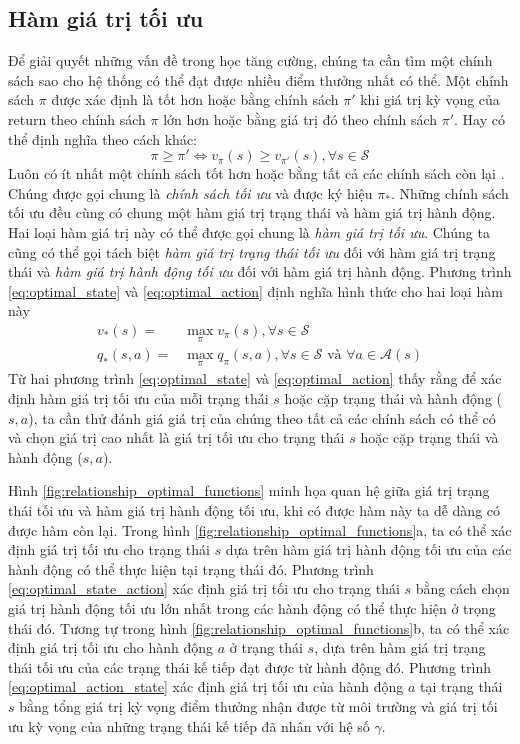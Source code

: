 	\subsection{Hàm giá trị tối ưu}
	Để giải quyết những vấn đề trong học tăng cường, chúng ta cần tìm một chính sách sao cho hệ thống có thể đạt được nhiều điểm thưởng nhất có thể. Một chính sách $\pi$ được xác định là tốt hơn hoặc bằng chính sách $\pi'$ khi giá trị kỳ vọng của return theo chính sách $\pi$ lớn hơn hoặc bằng giá trị đó theo chính sách $\pi'$. Hay có thể định nghĩa theo cách khác:
	\begin{equation}
		\pi \geq \pi' \Longleftrightarrow v_{\pi}(s) \geq v_{\pi'}(s), \forall s \in \mathcal{S}
	\end{equation}
	Luôn có ít nhất một chính sách tốt hơn hoặc bằng tất cả các chính sách còn lại \cite{sutton1998introduction}. Chúng được gọi chung là \textit{chính sách tối ưu} và được ký hiệu $\pi_{*}$. Những chính sách tối ưu đều cùng có chung một hàm giá trị trạng thái và hàm giá trị hành động. Hai loại hàm giá trị này có thể được gọi chung là \textit{hàm giá trị tối ưu}. Chúng ta cũng có thể gọi tách biệt \textit{hàm giá trị trạng thái tối ưu} đối với hàm giá trị trạng thái và \textit{hàm giá trị hành động tối ưu} đối với hàm giá trị hành động. Phương trình \ref{eq:optimal_state} và \ref{eq:optimal_action} định nghĩa hình thức cho hai loại hàm này
	\begin{align}
		v_{*}(s) = {} & \max_{\pi}v_{\pi}(s), \forall s \in \mathcal{S} \label{eq:optimal_state} \\
		q_{*}(s,a) = {} & \max_{\pi}q_{\pi}(s,a), \forall s \in \mathcal{S} \text{ và } \forall a \in \mathcal{A}(s) \label{eq:optimal_action}
	\end{align}
	Từ hai phương trình \ref{eq:optimal_state} và \ref{eq:optimal_action} thấy rằng để xác định hàm giá trị tối ưu của mỗi trạng thái $s$ hoặc cặp trạng thái và hành động ($s,a$), ta cần thử đánh giá giá trị của chúng theo tất cả các chính sách có thể có và chọn giá trị cao nhất là giá trị tối ưu cho trạng thái $s$ hoặc cặp trạng thái và hành động ($s,a$).
	
	Hình \ref{fig:relationship_optimal_functions} minh họa quan hệ giữa giá trị trạng thái tối ưu và hàm giá trị hành động tối ưu, khi có được hàm này ta dễ dàng có được hàm còn lại. Trong hình \ref{fig:relationship_optimal_functions}a, ta có thể xác định giá trị tối ưu cho trạng thái $s$ dựa trên hàm giá trị hành động tối ưu của các hành động có thể thực hiện tại trạng thái đó. Phương trình \ref{eq:optimal_state_action} xác định giá trị tối ưu cho trạng thái $s$ bằng cách chọn giá trị hành động tối ưu lớn nhất trong các hành động có thể thực hiện ở trọng thái đó. Tương tự trong hình \ref{fig:relationship_optimal_functions}b, ta có thể xác định giá trị tối ưu cho hành động $a$ ở trạng thái $s$, dựa trên hàm giá trị trạng thái tối ưu của các trạng thái kế tiếp đạt được từ hành động đó. Phương trình \ref{eq:optimal_action_state} xác định giá trị tối ưu của hành động $a$ tại trạng thái $s$ bằng tổng giá trị kỳ vọng điểm thưởng nhận được từ môi trường và giá trị tối ưu kỳ vọng của những trạng thái kế tiếp đã nhân với hệ số $\gamma$.
	
